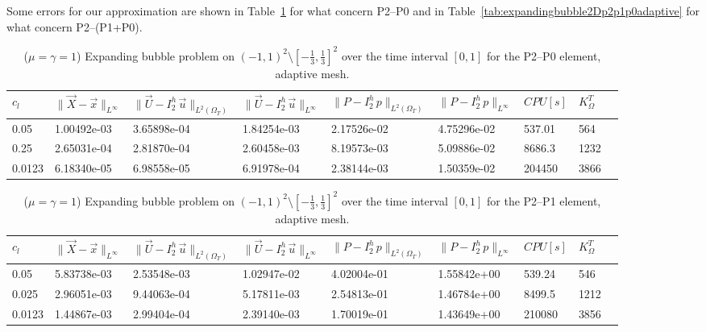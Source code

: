 \documentclass[a4paper,12pt,onecolumn]{article}
\newcommand{\errorXx}{\|\vec{X} - \vec{x}\|_{L^\infty}}
\newcommand{\LerrorUu}[1]{\|\vec U - I^h_{#1}\,\vec u\|_{L^2(\Omega_T)}}
\newcommand{\errorUu}[1]{\|\vec U - I^h_{#1}\,\vec u\|_{L^\infty}}
\newcommand{\errorPp}[1]{\|P - I^h_{#1}\,p\|_{L^\infty}}
\newcommand{\LerrorPp}[1]{\|P - I^h_{#1}\,p\|_{L^2(\Omega_T)}}
\begin{document}
Some errors for our approximation are shown in Table~\ref{tab:expandingbubble2Dp2p0adaptive} for what concern P2--P0 and in Table~\ref{tab:expandingbubble2Dp2p1p0adaptive} for what concern P2--(P1+P0).

\begin{table}
 \center
 \hspace*{-2cm}
\begin{tabular}{lllllllll}
\hline
$c_l$ & $\errorXx$ & $\LerrorUu2$ & $\errorUu2$ & $\LerrorPp2$ & $\errorPp2$ & $CPU[s]$ & $K_\Omega^T$\\
\hline
0.05 & 1.00492e-03 & 3.65898e-04 & 1.84254e-03 & 2.17526e-02 & 4.75296e-02 & 537.01 & 564\\
0.25 & 2.65031e-04 & 2.81870e-04 & 2.60458e-03 & 8.19573e-03 & 5.09886e-02 & 8686.3 & 1232\\
0.0123 & 6.18340e-05 & 6.98558e-05 & 6.91978e-04 & 2.38144e-03 & 1.50359e-02 & 204450 & 3866\\%
\hline
\end{tabular}
\hspace*{-2cm}
\caption{($\mu=\gamma=1$) Expanding bubble problem on $(-1,1)^2\setminus[-\frac{1}{3},\frac{1}{3}]^2$ over the time interval $[0,1]$ for the P2--P0 element, adaptive mesh.}
\label{tab:expandingbubble2Dp2p0adaptive}
\end{table}

\begin{table}
 \center
 \hspace*{-2cm}
\begin{tabular}{lllllllll}
\hline
$c_l$ & $\errorXx$ & $\LerrorUu2$ & $\errorUu2$ & $\LerrorPp2$ & $\errorPp2$ & $CPU[s]$ & $K_\Omega^T$\\
\hline
0.05 & 5.83738e-03 & 2.53548e-03 & 1.02947e-02 & 4.02004e-01 & 1.55842e+00 & 539.24 & 546\\
0.025 & 2.96051e-03 & 9.44063e-04 & 5.17811e-03 & 2.54813e-01 & 1.46784e+00 & 8499.5 & 1212\\
0.0123 & 1.44867e-03 & 2.99404e-04 & 2.39140e-03 & 1.70019e-01 & 1.43649e+00 & 210080 & 3856\\%
\hline
\end{tabular}
\hspace*{-2cm}
\caption{($\mu=\gamma=1$) Expanding bubble problem on $(-1,1)^2\setminus[-\frac{1}{3},\frac{1}{3}]^2$ over the time interval $[0,1]$ for the P2--P1 element, adaptive mesh.}
\label{tab:expandingbubble2Dp2p1adaptive}
\end{table}
\end{document}
